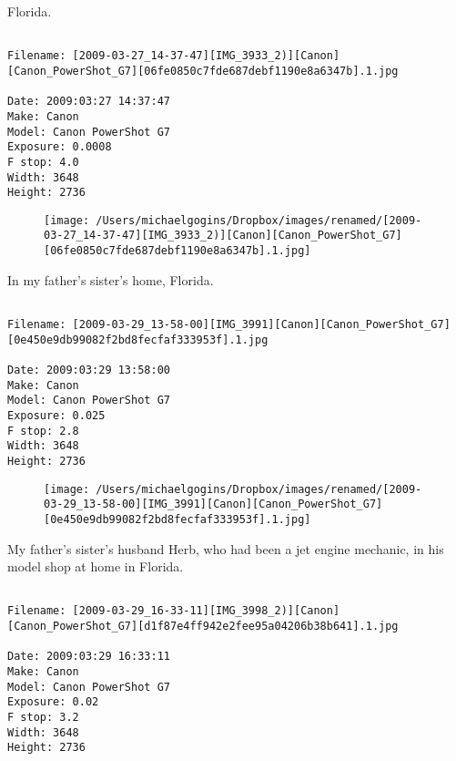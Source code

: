 \documentclass[11pt,letter,DIV=14,paper=landscape]{scrbook}
\begin{document}
\clearpage
\noindent Florida.
\noindent
\begin{lstlisting}

Filename: [2009-03-27_14-37-47][IMG_3933_2)][Canon][Canon_PowerShot_G7][06fe0850c7fde687debf1190e8a6347b].1.jpg

Date: 2009:03:27 14:37:47
Make: Canon
Model: Canon PowerShot G7
Exposure: 0.0008
F stop: 4.0
Width: 3648
Height: 2736
\end{lstlisting}
\clearpage

\begin{figure}
\texttt{[image: /Users/michaelgogins/Dropbox/images/renamed/[2009-03-27\_14-37-47][IMG\_3933\_2)][Canon][Canon\_PowerShot\_G7][06fe0850c7fde687debf1190e8a6347b].1.jpg]}
\end{figure}
    
\clearpage
\noindent In my father's sister's home, Florida.
\noindent
\begin{lstlisting}

Filename: [2009-03-29_13-58-00][IMG_3991][Canon][Canon_PowerShot_G7][0e450e9db99082f2bd8fecfaf333953f].1.jpg

Date: 2009:03:29 13:58:00
Make: Canon
Model: Canon PowerShot G7
Exposure: 0.025
F stop: 2.8
Width: 3648
Height: 2736
\end{lstlisting}
\clearpage

\begin{figure}
\texttt{[image: /Users/michaelgogins/Dropbox/images/renamed/[2009-03-29\_13-58-00][IMG\_3991][Canon][Canon\_PowerShot\_G7][0e450e9db99082f2bd8fecfaf333953f].1.jpg]}
\end{figure}
    
\clearpage
\noindent My father's sister's husband Herb, who had been a jet engine mechanic, in his model shop at home in Florida.
\noindent
\begin{lstlisting}

Filename: [2009-03-29_16-33-11][IMG_3998_2)][Canon][Canon_PowerShot_G7][d1f87e4ff942e2fee95a04206b38b641].1.jpg

Date: 2009:03:29 16:33:11
Make: Canon
Model: Canon PowerShot G7
Exposure: 0.02
F stop: 3.2
Width: 3648
Height: 2736
\end{lstlisting}
\clearpage
\end{document}
